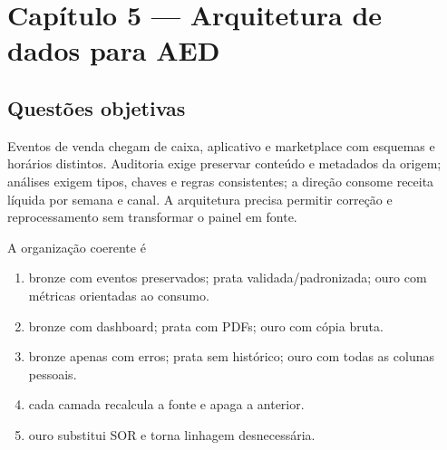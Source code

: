 \section{Capítulo 5 --- Arquitetura de dados para AED}
\subsection{Questões objetivas}
\TextoBase Eventos de venda chegam de caixa, aplicativo e marketplace com esquemas e horários distintos. Auditoria exige preservar conteúdo e metadados da origem; análises exigem tipos, chaves e regras consistentes; a direção consome receita líquida por semana e canal. A arquitetura precisa permitir correção e reprocessamento sem transformar o painel em fonte.
\begin{center}
\end{center}
\FonteDidatica
\Comando A organização coerente é
\begin{enumerate}[label=\Alph*)]\item bronze com eventos preservados; prata validada/padronizada; ouro com métricas orientadas ao consumo.\item bronze com dashboard; prata com PDFs; ouro com cópia bruta.\item bronze apenas com erros; prata sem histórico; ouro com todas as colunas pessoais.\item cada camada recalcula a fonte e apaga a anterior.\item ouro substitui SOR e torna linhagem desnecessária.\end{enumerate}

